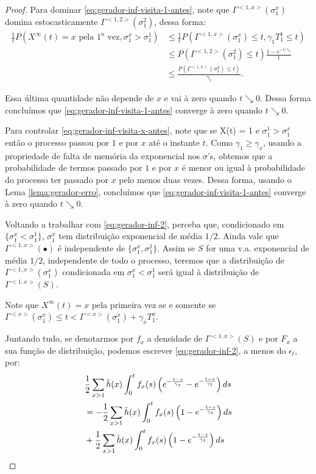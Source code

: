 \begin{proof}
  Para dominar \eqref{eq:gerador-inf-visita-1-antes}, note que
  $\Gamma^{<1, x>}(\sigma_1^x)$ domina estocasticamente $\Gamma^{<1,
    2>}(\sigma_1^2)$, dessa forma:
  \begin{align*}
    \frac{1}{t} P\left(
      X^\infty(t) = x \text{ pela } 1^a \text{ vez},
      \sigma^x_1 > \sigma^1_1
    \right)
    & \leq \frac{1}{t} P(\Gamma^{<1, x>}(\sigma^x_1) \leq t, \gamma_1 T^1_1 \leq
    t)\\
    &\leq P(\Gamma^{<1, 2>}(\sigma^2_1) \leq t) \frac{1 -
      e^{-t/\gamma_1}}{t}\\
    &\leq \frac{P(\Gamma^{<1, 2>}(\sigma^2_1) \leq t)}{\gamma_1}.
  \end{align*}

  Essa última quantidade não depende de $x$ e vai à zero quando $t
  \searrow 0$. Dessa forma concluímos que
  \eqref{eq:gerador-inf-visita-1-antes} converge à zero quando $t
  \searrow 0$.    

  Para controlar \eqref{eq:gerador-inf-visita-x-antes}, note que se
  X(t) = 1 e $\sigma_1^1 > \sigma_1^x$ então o processo passou por $1$
  e por $x$ até o instante $t$. Como $\gamma_1 \geq \gamma_x$, usando
  a propriedade de falta de memória da exponencial nos $\sigma$'s,
  obtemos que a probabilidade de termos passado por $1$ e por $x$ é
  menor ou igual à probabilidade do processo ter passado por $x$ pelo
  menos duas vezes. Dessa forma, usando o Lema
  \ref{lema:gerador-erro}, concluímos que
  \eqref{eq:gerador-inf-visita-1-antes} converge à zero quando $t
  \searrow 0$.

  
  Voltando a trabalhar com \eqref{eq:gerador-inf-2}, perceba que,
  condicionado em $\{\sigma^x_1 < \sigma^1_1\}$, $\sigma^x_1$ tem
  distribuição exponencial de média $1/2$. Ainda vale que $\Gamma^{<1,
    x>}(\bullet)$ é independente de $\{\sigma^x_1,
  \sigma^1_1\}$. Assim se $S$ for uma v.a. exponencial de média $1/2$,
  independente de todo o processo, teremos que a distribuição de
  $\Gamma^{<1, x>}(\sigma_1^x)$ condicionada em $\sigma^x_1 <
  \sigma_1^1$ será igual à distribuição de $\Gamma^{<1, x>}(S)$.


  Note que $X^\infty(t) = x$ pela primeira vez se e somente se
  $\Gamma^{<x>}(\sigma^x_1) \leq t < \Gamma^{<x>}(\sigma^x_1) +
  \gamma_x T^x_1$.

  Juntando tudo, se denotarmos por $f_x$ a densidade de $\Gamma^{<1,
    x>}(S)$ e por $F_x$ a sua função de distribuição, podemos escrever
  \eqref{eq:gerador-inf-2}, a menos do $\epsilon_t$, por:
  \begin{align}
    & \frac{1}{2} \sum_{x > 1} \bar{h}(x) \int_0^t f_x (s) \left(
      e^{-\frac{t-s}{\gamma_x}} - e^{-\frac{t-s}{\gamma_1}}
    \right) d s \notag\\
    \label{eq:gerador-inf-3}
    &= - \frac{1}{2} \sum_{x > 1} \bar{h}(x) \int_0^t f_x (s) \left(
      1 - e^{-\frac{t-s}{\gamma_x}}
    \right) d s\\
    \label{eq:gerador-inf-4}
    &+ \frac{1}{2} \sum_{x > 1} \bar{h}(x) \int_0^t f_x (s) \left(
      1 - e^{-\frac{t-s}{\gamma_1}}
    \right) d s
  \end{align}



\end{proof}

